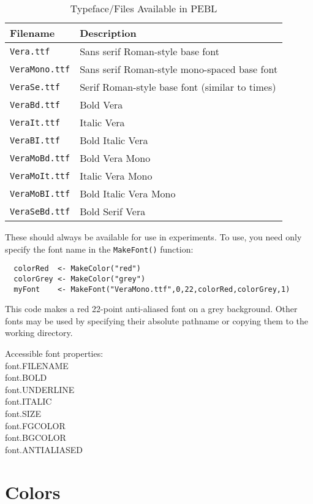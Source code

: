 \begin{table}[htbp]
\caption{Typeface/Files Available in PEBL}
\begin{tabular}{ll}
\toprule
\textbf{Filename}&\textbf{Description}\\
\midrule
\texttt{Vera.ttf}    &     Sans serif Roman-style base font\\
\texttt{VeraMono.ttf}&     Sans serif Roman-style mono-spaced base font\\
\texttt{VeraSe.ttf}  &     Serif Roman-style base font (similar to times)\\
\texttt{VeraBd.ttf}  &     Bold Vera\\
\texttt{VeraIt.ttf}  &     Italic Vera\\
\texttt{VeraBI.ttf}  &     Bold Italic Vera\\
\texttt{VeraMoBd.ttf}&     Bold Vera Mono\\
\texttt{VeraMoIt.ttf}&     Italic Vera Mono\\
\texttt{VeraMoBI.ttf}&     Bold Italic Vera Mono\\
\texttt{VeraSeBd.ttf}&     Bold Serif Vera\\
\bottomrule
\end{tabular}
\label{tab:fonts}
\end{table}



These should always be available for use in experiments. 
To use, you need only specify the font name in the \texttt{MakeFont()} function:
\begin{verbatim}
  colorRed  <- MakeColor("red")
  colorGrey <- MakeColor("grey")
  myFont    <- MakeFont("VeraMono.ttf",0,22,colorRed,colorGrey,1)
\end{verbatim}
This code makes a red 22-point anti-aliased font on a grey background. 
Other fonts may be used by specifying their absolute pathname 
or copying them to the working directory.


Accessible font properties:\\
 font.FILENAME\\
 font.BOLD\\
 font.UNDERLINE\\
 font.ITALIC\\
 font.SIZE\\
 font.FGCOLOR\\
 font.BGCOLOR\\
 font.ANTIALIASED\\


\section{Colors} 

